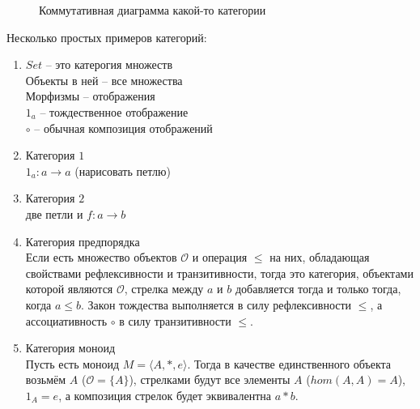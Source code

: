 \begin{figure}[b]
  \centering

  \caption{Коммутативная диаграмма какой-то категории}
  \label{fig:cd1}
\end{figure}
\begin{exm}
  Несколько простых примеров категорий:
  \begin{enumerate}
    \item $Set$ -- это катерогия множеств \\
      Объекты в ней -- все множества \\
      Морфизмы -- отображения \\
      $1_a$ -- тождественное отображение \\
      $\circ$ -- обычная композиция отображений
    \item Категория $1$ \\
      $1_a\colon a \to a$ (нарисовать петлю)
    \item Категория $2$ \\
      две петли и $f\colon a \to b$
    \item Категория предпорядка \\
      Если есть множество объектов $\mathcal{O}$ и операция $\leq$ на них,
      обладающая свойствами рефлексивности и транзитивности, тогда это категория,
      объектами которой являются $\mathcal{O}$, стрелка между $a$ и $b$
      добавляется тогда и только тогда, когда $a \leq b$. Закон тождества
      выполняется в силу рефлексивности $\leq$, а ассоциативность $\circ$ в силу
      транзитивности $\leq$.
    \item Категория моноид \\
      Пусть есть моноид $M = \langle A, *, e \rangle$. Тогда в качестве
      единственного объекта возьмём $A$ ($\mathcal{O} = \{ A \}$),
      стрелками будут все элементы $A$ ($hom(A, A) = A$), $1_A = e$, а композиция
      стрелок будет эквивалентна $a * b$.
  \end{enumerate}
\end{exm}

